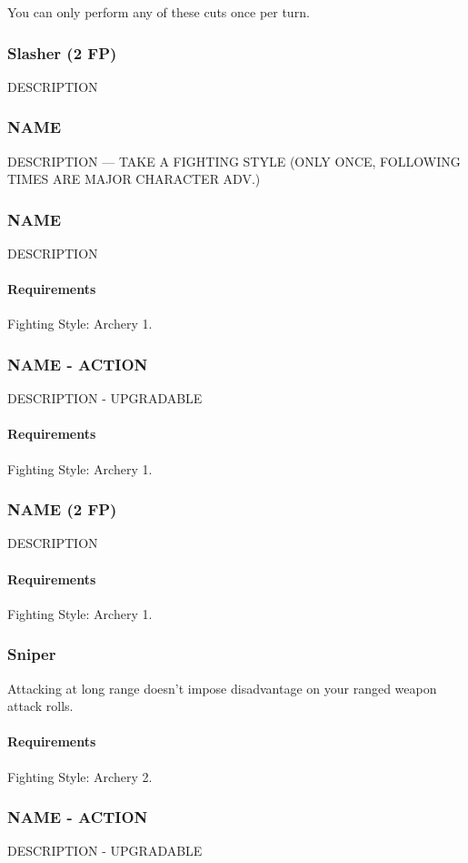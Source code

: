     You can only perform any of these cuts once per turn.
\subsubsection{Slasher (2 FP)} \label{feat::slasher}
    DESCRIPTION

\subsubsection{NAME} \label{feat::name}
    DESCRIPTION --- TAKE A FIGHTING STYLE (ONLY ONCE, FOLLOWING TIMES ARE MAJOR CHARACTER ADV.)
\subsubsection{NAME} \label{feat::name}
    DESCRIPTION
    \paragraph{Requirements} Fighting Style: Archery 1.
\subsubsection{NAME - ACTION} \label{feat::name}
    DESCRIPTION - UPGRADABLE
    \paragraph{Requirements} Fighting Style: Archery 1.
\subsubsection{NAME (2 FP)} \label{feat::name}
    DESCRIPTION
    \paragraph{Requirements} Fighting Style: Archery 1.
\subsubsection{Sniper} \label{feat::sniper}
    Attacking at long range doesn't impose disadvantage on your ranged weapon attack rolls.
    \paragraph{Requirements} Fighting Style: Archery 2.
\subsubsection{NAME - ACTION} \label{feat::name}
    DESCRIPTION - UPGRADABLE
